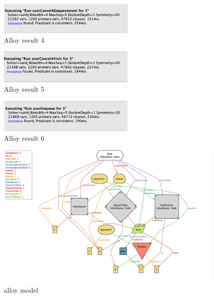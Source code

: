 \begin{figure}[h!]
    \centering
    \includegraphics[width=0.6\textwidth]{Images/alloy/usercancelsanenqueuement.png}
    \caption{\label{fig:usercancelsanenqueuementalloy}{Alloy result 4}}
\end{figure}

\begin{figure}[h!]
    \centering
    \includegraphics[width=0.6\textwidth]{Images/alloy/usercancelsavisit.png}
    \caption{\label{fig:usercancelsavisitalloy}{Alloy result 5}}
\end{figure}

\begin{figure}[h!]
    \centering
    \includegraphics[width=0.6\textwidth]{Images/alloy/userenqueue.png}
    \caption{\label{fig:usernenqueuealloy}{Alloy result 6}}
\end{figure}

\begin{figure}[h!]
    \centering
    \includegraphics[width=\textwidth]{Images/alloy/alloymodel.png}
    \caption{\label{fig:alloymodel}{alloy model}}
\end{figure}

\FloatBarrier